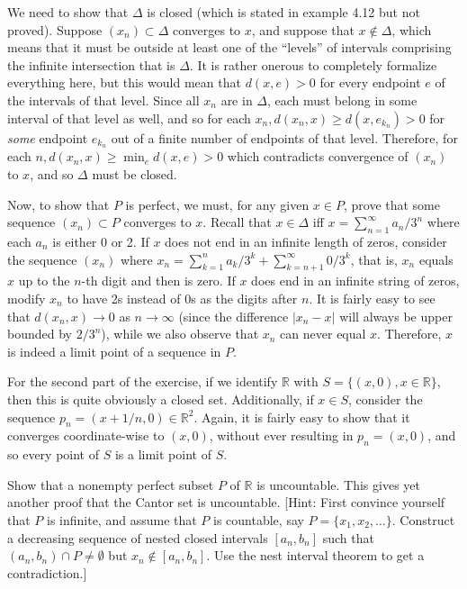 \begin{solution}

    We need to show that $\Delta$ is closed (which is stated in example 4.12 but not proved).
    Suppose $(x_n) \subset \Delta$ converges to $x$, and suppose that $x \notin \Delta$, which means that it must be outside at least one of the ``levels'' of intervals comprising the infinite intersection that is $\Delta$.
    It is rather onerous to completely formalize everything here, but this would mean that $d(x, e) > 0$ for every endpoint $e$ of the intervals of that level.
    Since all $x_n$ are in $\Delta$, each must belong in some interval of that level as well, and so  for each $x_n, d(x_n, x) \geq d(x, e_{k_n}) > 0$ for \textit{some} endpoint $e_{k_n}$ out of a finite number of endpoints of that level.
    Therefore, for each $n, d(x_n, x) \geq \min_e d(x, e) > 0$ which contradicts convergence of $(x_n)$ to $x$, and so $\Delta$ must be closed.

    Now, to show that $P$ is perfect, we must, for any given $x \in P$, prove that some sequence $(x_n) \subset P$ converges to $x$.
    Recall that $x \in \Delta$ iff $x = \sum_{n=1}^{\infty} a_n/3^n$ where each $a_n$ is either 0 or 2.
    If $x$ does not end in an infinite length of zeros, consider the sequence $(x_n)$ where $x_n = \sum_{k=1}^{n} a_k/3^k + \sum_{k=n+1}^{\infty} 0/3^k$, that is, $x_n$ equals $x$ up to the $n$-th digit and then is zero.
    If $x$ does end in an infinite string of zeros, modify $x_n$ to have 2s instead of 0s as the digits after $n$.
    It is fairly easy to see that $d(x_n, x) \rightarrow 0$ as $n \rightarrow \infty$ (since the difference $\lvert x_n - x \rvert$ will always be upper bounded by $2/3^n$), while we also observe that $x_n$ can never equal $x$. 
    Therefore, $x$ is indeed a limit point of a sequence in $P$.

    For the second part of the exercise, if we identify $\mathbb{R}$ with $S = \{(x, 0), x \in \mathbb{R}\}$, then this is quite obviously a closed set.
    Additionally, if $x \in S$, consider the sequence $p_n = (x + 1/n, 0) \in \mathbb{R}^2$.
    Again, it is fairly easy to show that it converges coordinate-wise to $(x, 0)$, without ever resulting in $p_n = (x, 0)$, and so every point of $S$ is a limit point of $S$.
\end{solution}

\begin{exercise}{39}
    Show that a nonempty perfect subset $P$ of $\mathbb{R}$ is uncountable.
    This gives yet another proof that the Cantor set is uncountable.
    [Hint: First convince yourself that $P$ is infinite, and assume that $P$ is countable, say $P = \{x_1, x_2, \ldots\}$.
    Construct a decreasing sequence of nested closed intervals $[a_n, b_n]$ such that $(a_n, b_n) \cap P \neq \emptyset$ but $x_n \notin [a_n, b_n]$.
    Use the nest interval theorem to get a contradiction.]
\end{exercise}

